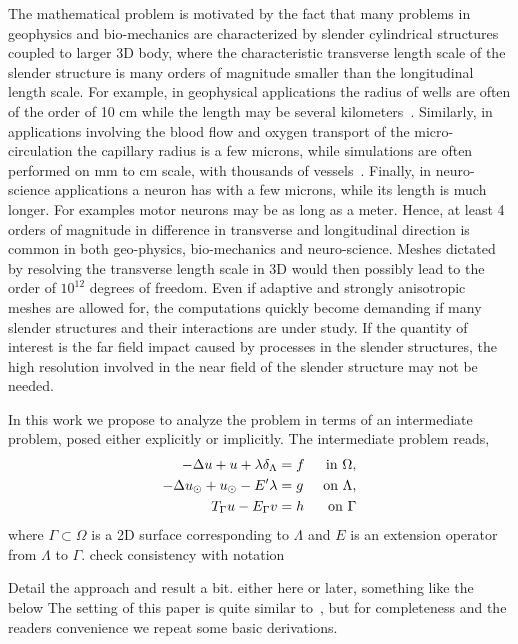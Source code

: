 \documentclass[r]{siamart171218}
\newcommand{\kent}[1]{{\color{blue}#1}}
\begin{document}
The mathematical problem is motivated by the fact that many problems in geophysics and bio-mechanics are characterized by slender cylindrical structures coupled to larger 3D body, where the characteristic transverse length scale of the slender structure is many orders of magnitude smaller than the longitudinal length scale.  For example, in geophysical applications the radius of wells are often of the order of 10 cm while the length may be several kilometers~\cite{gjerde2019singularity}. Similarly, in applications involving the blood flow and oxygen transport of the micro-circulation the capillary radius is a few microns, while simulations are often performed on mm to cm scale, with thousands of vessels~\cite{berg2020modelling,fang2008oxygen,gould2017capillary}. Finally, in neuro-science applications a neuron has with a few microns, while  its length is much longer. For examples motor neurons may be as long as a meter.  Hence,  at least 4 orders of magnitude in difference in transverse and longitudinal direction is common in both geo-physics, bio-mechanics and neuro-science. Meshes dictated by resolving the transverse length scale in 3D would then possibly lead to the order of $10^{12}$ degrees of freedom. Even if adaptive and strongly anisotropic meshes are allowed for, the computations quickly become demanding if many slender structures and their interactions are under study.  If the quantity of interest is the far field impact caused by processes in the slender structures, the high resolution involved in the near field of the slender structure may not be needed.  

In this work we propose to analyze the problem in terms of an intermediate problem, posed either explicitly or implicitly. The intermediate problem reads, 
\begin{subequations}
\label{inteq:pde}
\begin{align}
\label{inteq:pde1}
  -\Delta u + u + \lambda \delta_{\Lambda} &= f &\mbox{ in } \Omega,\\
\label{inteq:pde2}
-\Delta \ud + \ud - E' \lambda  &= g &\mbox{ on } \Lambda,\\
\label{inteq:coupling}
T_\Gamma u - E_\Gamma v  &=  h &\mbox{ on } \Gamma
\end{align}
\end{subequations}
where $\Gamma \subset \Omega$ is a 2D surface corresponding to $\Lambda$
and $E$ is an extension operator from $\Lambda$ to $\Gamma$. 
\kent{check consistency with notation}

Detail the approach and result a bit.
\kent{either here or later, something like the below}
The setting of this paper is quite
similar to~\cite{laurino_m2an}, but for completeness and the readers convenience we repeat some basic derivations. 
\end{document}
